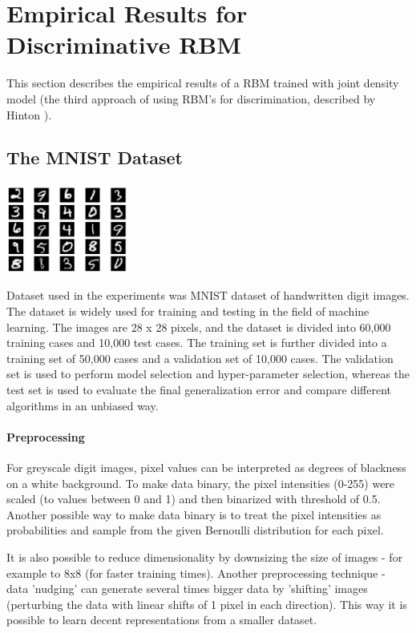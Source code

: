 \documentclass[a4paper]{scrartcl}
\begin{document}
\newpage
 
\section{Empirical Results for Discriminative RBM}
This section describes the empirical results of a RBM trained with joint density model (the third approach of using RBM's for discrimination, described by Hinton \cite{Hinton}). 
\subsection{The MNIST Dataset}
\begin{center}
\includegraphics[width=4cm]{images/mnist2.png}
\end{center}
\par Dataset used in the experiments was MNIST dataset of handwritten digit images. The dataset is widely used for training and testing in the field of machine learning. The images are 28 x 28 pixels, and the dataset is divided into 60,000 training cases and 10,000 test cases. The training set is further divided into a training set of 50,000 cases and a validation set of 10,000 cases. The validation set is used to perform model selection and hyper-parameter selection, whereas the test set is used to evaluate the final generalization error and compare different algorithms in an unbiased way.
\paragraph{Preprocessing} For greyscale digit images, pixel values can be interpreted as degrees of blackness on a white background. To make data binary, the pixel intensities (0-255) were scaled (to values between 0 and 1) and then binarized with threshold of 0.5. Another possible way to make data binary is to treat the pixel intensities as probabilities and sample from the given Bernoulli distribution for each pixel. 
\par It is also possible to reduce dimensionality by downsizing the size of images - for example to 8x8 (for faster training times). Another preprocessing technique - data 'nudging' can generate several times bigger data by 'shifting' images (perturbing the data with linear shifts of 1 pixel in each direction). This way it is possible to learn decent representations from a smaller dataset.
\end{document}
